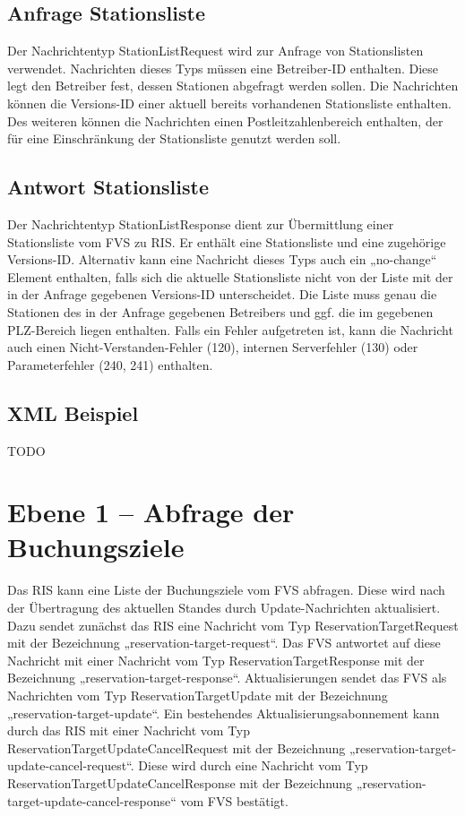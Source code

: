 

\subsection{Anfrage Stationsliste}
Der Nachrichtentyp StationListRequest wird zur Anfrage von Stationslisten verwendet. Nachrichten dieses Typs müssen eine Betreiber-ID enthalten. Diese legt den Betreiber fest, dessen Stationen abgefragt werden sollen. Die Nachrichten können die Versions-ID einer aktuell bereits vorhandenen Stationsliste enthalten. Des weiteren können die Nachrichten einen Postleitzahlenbereich enthalten, der für eine Einschränkung der Stationsliste genutzt werden soll.



\subsection{Antwort Stationsliste}
Der Nachrichtentyp StationListResponse dient zur Übermittlung einer Stationsliste vom FVS zu RIS. Er enthält eine Stationsliste und eine zugehörige Versions-ID. Alternativ kann eine Nachricht dieses Typs auch ein „no-change“ Element enthalten, falls sich die aktuelle Stationsliste nicht von der Liste mit der in der Anfrage gegebenen Versions-ID  unterscheidet. Die Liste muss genau die Stationen des in der Anfrage gegebenen Betreibers und ggf. die im gegebenen PLZ-Bereich liegen enthalten. Falls ein Fehler aufgetreten ist, kann die Nachricht auch einen Nicht-Verstanden-Fehler (120), internen Serverfehler (130) oder Parameterfehler (240, 241) enthalten.



\subsection{XML Beispiel}
TODO

\section{Ebene 1 -- Abfrage der Buchungsziele}
Das RIS kann eine Liste der Buchungsziele vom FVS abfragen. Diese wird nach der Übertragung des aktuellen Standes durch Update-Nachrichten aktualisiert. Dazu sendet zunächst das RIS eine Nachricht vom Typ ReservationTargetRequest mit der Bezeichnung „reservation-target-request“. Das FVS antwortet auf diese Nachricht mit einer Nachricht vom Typ ReservationTargetResponse mit der Bezeichnung „reservation-target-response“. Aktualisierungen sendet das FVS als Nachrichten vom Typ ReservationTargetUpdate mit der Bezeichnung „reservation-target-update“. Ein bestehendes Aktualisierungsabonnement kann durch das RIS mit einer Nachricht vom Typ ReservationTargetUpdateCancelRequest mit der Bezeichnung „reservation-target-update-cancel-request“. Diese wird durch eine Nachricht vom Typ ReservationTargetUpdateCancelResponse mit der Bezeichnung „reservation-target-update-cancel-response“ vom FVS bestätigt.

